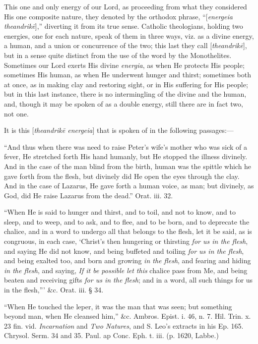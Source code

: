 This one and only energy of our Lord, as
proceeding from what they considered His one composite nature, they
denoted by the orthodox phrase, ``[\emph{energeia theandrik\={e}}],''
diverting it from its true sense. Catholic theologians, holding
two energies, one for each nature, speak of them in three ways, viz.
as a divine energy, a human, and a union or concurrence of the two;
this last they call [\emph{theandrik\={e}}], but in a sense quite
distinct from the use of the word by the Monothelites. Sometimes our
Lord exerts His divine \emph{energia}, as when He protects His people;
sometimes His human, as when He underwent hunger and thirst; sometimes
both at once, as in making clay and restoring sight, or in His
suffering for His people; but in this last instance, there is no
intermingling of the divine and the human, and, though it may be
spoken of as a double energy, still there are in fact two, not one.

It is this [\emph{theandrik\={e} energeia}]
that is spoken of in the following passages:—

``And thus when there was need to raise Peter's
wife's mother who was sick of a fever, He stretched forth His hand
humanly, but He stopped the illness divinely. And in the case of the
man blind from the birth, human was the spittle which he gave forth
from the flesh, but divinely did He open the eyes through the clay.
And in the case of Lazarus, He gave forth a human voice, as man; but
divinely, as God, did He raise Lazarus from the dead.'' Orat. iii. 32.

``When He is said to hunger and thirst, and to
toil, and not to know, and to sleep, and to weep, and to ask, and to
flee, and to be born, and to deprecate the chalice, and in a word to
undergo all that belongs to the flesh, let it be said, as is
congruous, in each case, ‘Christ's then hungering or thirsting \emph{for
us in the flesh}, and saying He did not know, and being buffeted
and toiling \emph{for us in the flesh}, and being exalted too,
and born and growing \emph{in the flesh}, and fearing and hiding \emph{in
the flesh}, and saying, \emph{If it be possible let this} chalice
pass from Me, and being beaten and receiving gifts \emph{for us in the
flesh}; and in a word, all such things for us in the flesh,'''
\&c. Orat. iii. § 34.

``When He touched the leper, it was the man that
was seen; but something beyond man, when He cleansed him,'' \&c.
Ambros. Epist. i. 46, n. 7. Hil. Trin. x. 23 fin. vid. \emph{Incarnation}
and \emph{Two Natures}, and S. Leo's extracts in his Ep. 165. Chrysol.
Serm. 34 and 35. Paul. ap Conc. Eph. t. iii. (p. 1620, Labbe.)

